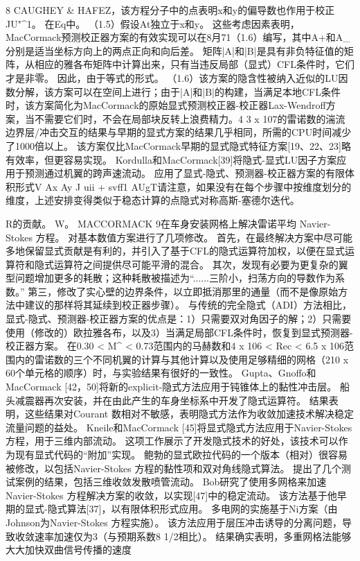 \documentclass[UTF8,11pt,a4paper,openany,fontset=fandol]{ctexbook}
\begin{document}
8 CAUGHEY \& HAFEZ，该方程分子中的点表明x和y的偏导数也作用于校正JU"\textasciicircum{}1。 在Eq中。 （1.5）假设At独立于x和y。 这些考虑因素表明，MacCormack预测校正器方案的有效实现可以在8月71（1.6）编写，其中A+和A\_分别是适当坐标方向上的两点正向和向后差。 矩阵|A|和|B|是具有非负特征值的矩阵，从相应的雅各布矩阵中计算出来，只有当违反局部（显式）CFL条件时，它们才是非零。 因此，由于等式的形式。 （1.6）该方案的隐含性被纳入近似的LU因数分解，该方案可以在空间上进行；由于|A|和|B|的构建，当满足本地CFL条件时，该方案简化为MacCormack的原始显式预测校正器-校正器Lax-Wendroff方案，当不需要它们时，不会在局部块反转上浪费精力。4 3 x 107的雷诺数的湍流边界层/冲击交互的结果与早期的显式方案的结果几乎相同，所需的CPU时间减少了1000倍以上。 该方案仅比MacCormack早期的显式隐式特征方案[19、22、23]略有效率，但更容易实现。 Kordulla和MacCormack[39]将隐式-显式LU因子方案应用于预测通过机翼的跨声速流动。 应用了显式-隐式、预测器-校正器方案的有限体积形式V Ax Ay J uii + svff1 AUgT请注意，如果没有在每个步骤中按维度划分的维度，上述安排变得类似于稳态计算的点隐式对称高斯-塞德尔迭代。

R的贡献。 W。 MACCORMACK 9在车身安装网格上解决雷诺平均 Navier-Stokes 方程。 对基本数值方案进行了几项修改。 首先，在最终解决方案中尽可能多地保留显式贡献是有利的，并引入了基于CFL的隐式运算符加权，以便在显式运算符和隐式运算符之间提供尽可能平滑的混合。 其次，发现有必要为更复杂的翼型问题增加更多的耗散；这种耗散被描述为“......三阶小，扫荡方向的导数作为系数。” 第三，修改了实心壁的边界条件，以立即抵消那里的通量（而不是像原始方法中建议的那样将其延续到校正器步骤）。 与传统的完全隐式（ADI）方法相比，显式-隐式、预测器-校正器方案的优点是：1）只需要双对角因子的解；2）只需要使用（修改的）欧拉雅各布，以及3）当满足局部CFL条件时，恢复到显式预测器-校正器方案。 在0.30 < M\textasciicircum{} < 0.73范围内的马赫数和4 x 106 < Rec < 6.5 x 106范围内的雷诺数的三个不同机翼的计算与其他计算以及使用足够精细的网格（210 x 60个单元格的顺序）时，与实验结果有很好的一致性。 Gupta、Gnoffo和MacCormack [42，50]将新的explicit-隐式方法应用于钝锥体上的黏性冲击层。 船头减震器再次安装，并在由此产生的车身坐标系中开发了隐式运算符。 结果表明，这些结果对Courant 数相对不敏感，表明隐式方法作为收敛加速技术解决稳定流量问题的益处。 Kneile和MacCormack [45]将显式隐式方法应用于Navier-Stokes 方程，用于三维内部流动。 这项工作展示了开发隐式技术的好处，该技术可以作为现有显式代码的“附加”实现。 鲍勃的显式欧拉代码的一个版本（相对）很容易被修改，以包括Navier-Stokes 方程的黏性项和双对角线隐式算法。 提出了几个测试案例的结果，包括三维收敛发散喷管流动。 Bob研究了使用多网格来加速Navier-Stokes 方程解决方案的收敛，以实现[47]中的稳定流动。 该方法基于他早期的显式-隐式算法[37]，以有限体积形式应用。 多电网的实施基于Ni方案（由Johnson为Navier-Stokes 方程实施）。 该方法应用于层压冲击诱导的分离问题，导致收敛速率加速仅为3（与预期系数8 1/2相比）。 结果确实表明，多重网格法能够大大加快双曲信号传播的速度
\end{document}
